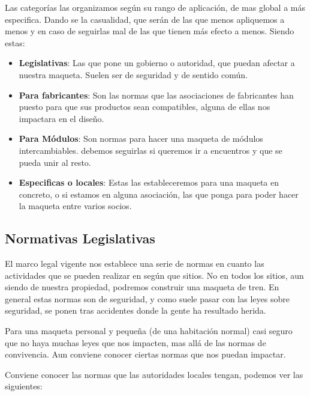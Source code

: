 Las categorías las organizamos según su rango de aplicación, de mas global a más especifica. Dando se la casualidad, que serán de las que menos apliquemos a menos y en caso de seguirlas mal de las que tienen más efecto a menos. Siendo estas:
\begin{itemize}
	\item \textbf{Legislativas}: Las que pone un gobierno o autoridad, que puedan afectar a nuestra maqueta. Suelen ser de seguridad y de sentido común.
	\item \textbf{Para fabricantes}: Son las normas que las asociaciones de fabricantes han puesto para que sus productos sean compatibles, alguna de ellas nos impactara en el diseño.
	\item \textbf{Para Módulos}: Son normas para hacer una maqueta de módulos intercambiables. debemos seguirlas si queremos ir a encuentros y que se pueda unir al resto.
	\item \textbf{Especificas o locales}: Estas las estableceremos para una maqueta en concreto, o si estamos en alguna asociación, las que ponga para poder hacer la maqueta entre varios socios.
\end{itemize}

\subsection{Normativas Legislativas}
El marco legal vigente nos establece una serie de normas en cuanto las actividades que se pueden realizar en según que sitios. No en todos los sitios, aun siendo de nuestra propiedad, podremos construir una maqueta de tren. En general estas normas son de seguridad, y como suele pasar con las leyes sobre seguridad, se ponen tras accidentes donde la gente ha resultado herida. 

Para una maqueta personal y pequeña (de una habitación normal) casi seguro que no haya muchas leyes que nos impacten, mas allá de las normas de convivencia. Aun conviene conocer ciertas normas que nos puedan impactar. 

Conviene conocer las normas que las autoridades locales tengan, podemos ver las siguientes:

